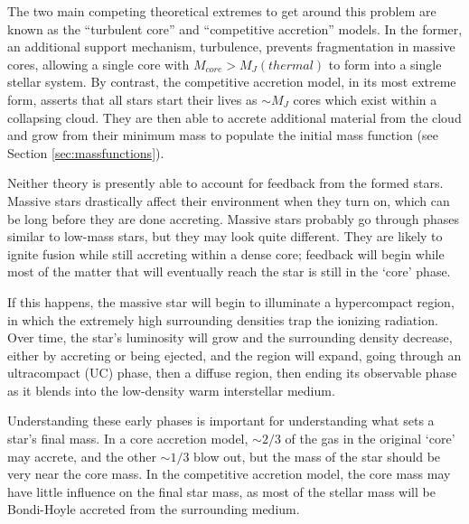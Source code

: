 The two main competing theoretical extremes to get around this problem are
known as the ``turbulent core'' and ``competitive accretion'' models.  In the
former, an additional support mechanism, turbulence, prevents fragmentation in
massive cores, allowing a single core with $M_{core}>M_J(thermal)$ to form into a
single stellar system.  By contrast, the competitive accretion model, in its
most extreme form, asserts that all stars start their lives as $\sim M_J$ cores
which exist within a collapsing cloud.  They are then able to accrete
additional material from the cloud and grow from their minimum mass to populate the
initial mass function (see Section \ref{sec:massfunctions}).

Neither theory is presently able to account for feedback from the formed stars.
Massive stars drastically affect their environment when they turn on, which can
be long before they are done accreting.  Massive stars probably go through
phases similar to low-mass stars, but they may look quite different.  They are
likely to ignite fusion while still accreting within a dense core; feedback
will begin while most of the matter that will eventually reach the star is still
in the `core' phase.

If this happens, the massive star will begin to
illuminate a hypercompact \hii region, in which the extremely high surrounding
densities trap the ionizing radiation.  Over time, the star's luminosity will
grow and the surrounding density decrease, either by accreting or being
ejected, and the \hii region will expand, going through an ultracompact (UC)
\hii phase, then a diffuse \hii region, then ending its observable phase as it
blends into the low-density warm interstellar medium.

Understanding these early phases is important for understanding what sets a star's
final mass.  In a core accretion model, $\sim2/3$ of the gas in the original
`core' may accrete, and the other $\sim1/3$ blow out, but the mass of the star
should be very near the core mass.  In the competitive accretion model, the core
mass may have little influence on the final star mass, as most of the stellar mass
will be Bondi-Hoyle accreted from the surrounding medium.

